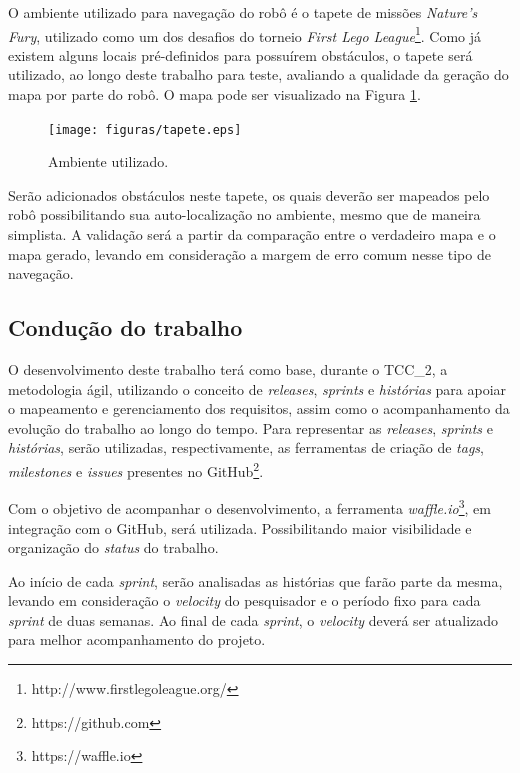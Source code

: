 		O ambiente utilizado para navegação do robô é o tapete de missões \textit{Nature's Fury}, utilizado como um dos desafios do torneio \textit{First Lego League}\footnote{http://www.firstlegoleague.org/}. Como já existem alguns locais pré-definidos para possuírem obstáculos, o tapete será utilizado, ao longo deste trabalho para teste, avaliando a qualidade da geração do mapa por parte do robô. O mapa pode ser visualizado na Figura \ref{img:tapete}.

		\begin{figure}[H]
			\centering
			\texttt{[image: figuras/tapete.eps]}
			\caption[Ambiente utilizado]{Ambiente utilizado.}
			\label{img:tapete}
		\end{figure}

		Serão adicionados obstáculos neste tapete, os quais deverão ser mapeados pelo robô possibilitando sua auto-localização no ambiente, mesmo que de maneira simplista. A validação será a partir da comparação entre o verdadeiro mapa e o mapa gerado, levando em consideração a margem de erro comum nesse tipo de navegação.


	\subsection{Condução do trabalho} %
	\label{sub:condução_do_trabalho}

		O desenvolvimento deste trabalho terá como base, durante o TCC\_2, a metodologia ágil, utilizando o conceito de \textit{releases}, \textit{sprints} e \textit{histórias} para apoiar o mapeamento e gerenciamento dos requisitos, assim como o acompanhamento da evolução do trabalho ao longo do tempo. Para representar as \textit{releases}, \textit{sprints} e \textit{histórias}, serão utilizadas, respectivamente, as ferramentas de criação de \textit{tags}, \textit{milestones} e \textit{issues} presentes no GitHub\footnote{https://github.com}.

		Com o objetivo de acompanhar o desenvolvimento, a ferramenta \textit{waffle.io}\footnote{https://waffle.io}, em integração com o GitHub, será utilizada. Possibilitando maior visibilidade e organização do \textit{status} do trabalho.

		Ao início de cada \textit{sprint}, serão analisadas as histórias que farão parte da mesma, levando em consideração o \textit{velocity} do pesquisador e o período fixo para cada \textit{sprint} de duas semanas. Ao final de cada \textit{sprint}, o \textit{velocity} deverá ser atualizado para melhor acompanhamento do projeto.


